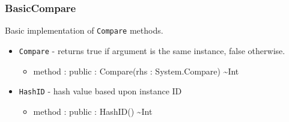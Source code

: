 \documentclass[11pt]{article}
\begin{document}
\subsubsection{BasicCompare}
Basic implementation of \texttt{Compare} methods.
\begin{itemize}
\item \texttt{Compare} - returns true if argument is the same
  instance, false otherwise.
  \begin{itemize}
  \item method : public : Compare(rhs : System.Compare) \textasciitilde Int
  \end{itemize}
\item \texttt{HashID} - hash value based upon instance ID
  \begin{itemize}
  \item method : public : HashID() \textasciitilde Int
  \end{itemize}
\end{itemize}
\end{document}
